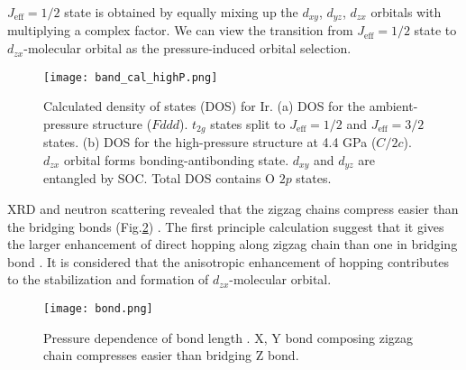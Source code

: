 \documentclass[a4,10.5pt]{report}
\begin{document}
$J_{\mathrm{eff}} = 1/2$ state is obtained by equally mixing up the $d_{xy}$, $d_{yz}$, $d_{zx}$ orbitals with multiplying a complex factor. 
We can view the transition from $J_{\mathrm{eff}} = 1/2$ state to $d_{zx}$-molecular orbital as the pressure-induced orbital selection.

\begin{figure}
  \centering
  \texttt{[image: band\_cal\_highP.png]}
  \caption{Calculated density of states (DOS) for Ir. \cite{takayama2018pressure}
  (a) DOS for the ambient-pressure structure ($Fddd$).
  $t_{2g}$ states split to $J_{\mathrm{eff}} = 1/2$ and $J_{\mathrm{eff}} = 3/2$ states.
  (b) DOS for the high-pressure structure at 4.4 GPa ($C/2c$).
  $d_{zx}$ orbital forms bonding-antibonding state.
  $d_{xy}$ and $d_{yz}$ are entangled by SOC.
  Total DOS contains O $2p$ states.}
  \label{band_cal_highP}
\end{figure}


XRD and neutron scattering revealed that the zigzag chains compress easier than the bridging bonds (Fig.\ref{bond}) \cite{veiga2017pressure, takayama2018pressure}. 
The first principle calculation suggest that it gives the larger enhancement of direct hopping along zigzag chain than one in bridging bond \cite{Kim2016}.
It is considered that the anisotropic enhancement of hopping contributes to the stabilization and formation of $d_{zx}$-molecular orbital.

\begin{figure}
  \centering
  \texttt{[image: bond.png]}
  \caption{Pressure dependence of bond length \cite{veiga2017pressure, takayama2018pressure}. X, Y bond composing zigzag chain compresses easier than bridging Z bond.}
  \label{bond}
\end{figure}
\end{document}
